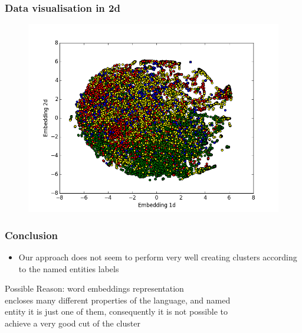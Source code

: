 \documentclass{beamer}
\begin{document}
\begin{frame}
\frametitle{Data visualisation in 2d}
\begin{figure}
\includegraphics[width=0.8\linewidth]{../REPORT/Figures_Mik/embedding2DTrue_labelsColor2.png}  
\end{figure}
\end{frame}


\begin{frame}
\frametitle{Conclusion}
\begin{itemize} 
\item Our approach does not seem to perform very well creating clusters according to the named entities labels
\end{itemize}

  \hspace{1cm} Possible Reason: word embeddings representation \\
   \hspace{1cm} encloses many different properties of the language, and named \\
    \hspace{1cm} entity it is just one of them, consequently it is not possible to \\
      \hspace{1cm} achieve a very good cut of the cluster
\end{frame}



 
 
 
\end{document}
